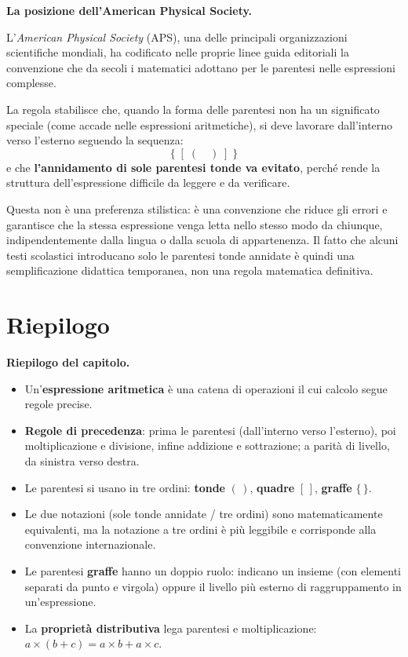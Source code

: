 \begin{sapevi}
    \textbf{La posizione dell'American Physical Society.}

    L'\emph{American Physical Society} (APS), una delle principali organizzazioni
    scientifiche mondiali, ha codificato nelle proprie linee guida editoriali la
    convenzione che da secoli i matematici adottano per le parentesi nelle
    espressioni complesse.

    La regola stabilisce che, quando la forma delle parentesi non ha un significato
    speciale (come accade nelle espressioni aritmetiche), si deve lavorare
    dall'interno verso l'esterno seguendo la sequenza:
    \[
        \{ \;[\; (\quad) \;]\; \}
    \]
    e che \textbf{l'annidamento di sole parentesi tonde va evitato},
    perché rende la struttura dell'espressione difficile da leggere e da verificare.

    Questa non è una preferenza stilistica: è una convenzione che riduce
    gli errori e garantisce che la stessa espressione venga letta nello stesso
    modo da chiunque, indipendentemente dalla lingua o dalla scuola di appartenenza.
    Il fatto che alcuni testi scolastici introducano solo le parentesi tonde
    annidate è quindi una semplificazione didattica temporanea, non una regola
    matematica definitiva.
\end{sapevi}

\section*{Riepilogo}

\begin{regola}
    \textbf{Riepilogo del capitolo.}
    \begin{itemize}[leftmargin=1.5em]
        \item Un'\textbf{espressione aritmetica} è una catena di operazioni il
              cui calcolo segue regole precise.
        \item \textbf{Regole di precedenza}: prima le parentesi (dall'interno
              verso l'esterno), poi moltiplicazione e divisione, infine addizione
              e sottrazione; a parità di livello, da sinistra verso destra.
        \item Le parentesi si usano in tre ordini: \textbf{tonde} $(\,)$,
              \textbf{quadre} $[\,]$, \textbf{graffe} $\{\,\}$.
        \item Le due notazioni (sole tonde annidate / tre ordini) sono
              matematicamente equivalenti, ma la notazione a tre ordini è
              più leggibile e corrisponde alla convenzione internazionale.
        \item Le parentesi \textbf{graffe} hanno un doppio ruolo: indicano
              un insieme (con elementi separati da punto e virgola) oppure
              il livello più esterno di raggruppamento in un'espressione.
        \item La \textbf{proprietà distributiva} lega parentesi e
              moltiplicazione: $a \times (b + c) = a \times b + a \times c$.
    \end{itemize}
\end{regola}
